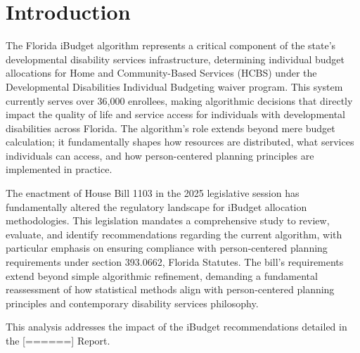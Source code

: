 ﻿\section{Introduction}

The Florida iBudget algorithm represents a critical component of the state's developmental disability services infrastructure, determining individual budget allocations for Home and Community-Based Services (HCBS) under the Developmental Disabilities Individual Budgeting waiver program. This system currently serves over 36,000 enrollees, making algorithmic decisions that directly impact the quality of life and service access for individuals with developmental disabilities across Florida. The algorithm's role extends beyond mere budget calculation; it fundamentally shapes how resources are distributed, what services individuals can access, and how person-centered planning principles are implemented in practice.

The enactment of House Bill 1103 in the 2025 legislative session has fundamentally altered the regulatory landscape for iBudget allocation methodologies. This legislation mandates a comprehensive study to review, evaluate, and identify recommendations regarding the current algorithm, with particular emphasis on ensuring compliance with person-centered planning requirements under section 393.0662, Florida Statutes. The bill's requirements extend beyond simple algorithmic refinement, demanding a fundamental reassessment of how statistical methods align with person-centered planning principles and contemporary disability services philosophy.

This analysis addresses the impact of the iBudget recommendations detailed in the [======] Report. 

